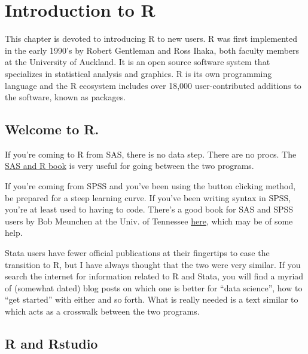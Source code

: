 \documentclass[
]{book}
\begin{document}
\hypertarget{introduction-to-r}{%
\chapter{Introduction to R}\label{introduction-to-r}}

This chapter is devoted to introducing R to new users. R was first implemented in the early 1990's by Robert Gentleman and Ross Ihaka, both faculty members at the University of Auckland. It is an open source software system that specializes in statistical analysis and graphics. R is its own programming language and the R ecosystem includes over 18,000 user-contributed additions to the software, known as packages.

\hypertarget{welcome-to-r.}{%
\section{Welcome to R.}\label{welcome-to-r.}}

If you're coming to R from SAS, there is no data step. There are no
procs. The \href{https://www.amazon.com/gp/product/1466584491/ref=as_li_tl?ie=UTF8\&camp=1789\&creative=390957\&creativeASIN=1466584491\&linkCode=as2\&tag=sasandrblog-20}{SAS and R
book}
\citet{kleinman} is very useful for going between the two programs.

If you're coming from SPSS and you've been using the button clicking
method, be prepared for a steep learning curve. If you've been writing
syntax in SPSS, you're at least used to having to code. There's a good
book for SAS and SPSS users by Bob Meunchen at the Univ. of Tennessee
\href{https://www.amazon.com/SAS-SPSS-Users-Statistics-Computing/dp/1461406846}{here},
which may be of some help.

Stata users have fewer official publications at their fingertips to ease
the transition to R, but I have always thought that the two were very
similar. If you search the internet for information related to R and
Stata, you will find a myriad of (somewhat dated) blog posts on which
one is better for ``data science'', how to ``get started'' with either and
so forth. What is really needed is a text similar to \citet{kleinman} which
acts as a crosswalk between the two programs.

\hypertarget{r-and-rstudio}{%
\section{R and Rstudio}\label{r-and-rstudio}}
\end{document}
